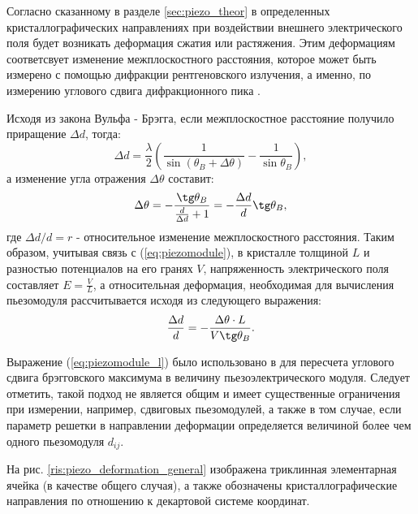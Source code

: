\label{sec:pieao_method}
Согласно сказанному в разделе \ref{sec:piezo_theor} в определенных кристаллографических
направлениях при воздействии внешнего электрического поля будет возникать деформация
сжатия или растяжения. Этим деформациям соответсвует изменение межплоскостного
 расстояния, которое может быть измерено с помощью дифракции рентгеновского
 излучения, а именно, по измерению углового сдвига дифракционного пика \cite{marchenkov2014}.

Исходя из закона Вульфа - Брэгга, если межплоскостное расстояние получило приращение
$\Delta d$, тогда:
$$ \Delta d = \frac{\lambda}{2}\left( \frac{1}{\sin(\theta_B + \Delta \theta) } - \frac{1}{\sin \theta_B } \right), $$
\noindent
а изменение угла отражения $\Delta \theta$ составит:
\begin{equation}
   \Delta \theta =-  \frac{\tg \theta_B}{\frac{d}{\Delta d}+1}  = -  \frac{\Delta d }{d}  \tg \theta_B,
\end{equation}
\noindent
где $\Delta d/d = r$ - относительное изменение межплоскостного расстояния.
Таким образом, учитывая связь с
(\ref{eq:piezomodule}),  в кристалле толщиной $L$ и разностью потенциалов на его
гранях $V$, напряженность электрического поля составляет $E = \frac{V}{L}$, а
относительная деформация, необходимая для вычисления пьезомодуля
 рассчитывается исходя из следующего выражения:
 \begin{equation}
    \frac{\Delta d}{d}  = -\frac{\Delta \theta \cdot L}{V \tg \theta_B}.
    \label{eq:piezomodule_l}
 \end{equation}

Выражение (\ref{eq:piezomodule_l}) было использовано в
\cite{kibalin2015, marchenkov2014,piezo101,piezo102} для
пересчета углового сдвига брэгговского максимума в величину пьезоэлектрического модуля.
Следует отметить, такой подход не является общим и имеет существенные ограничения при
измерении, например, сдвиговых пьезомодулей, а также в том случае, если параметр решетки
в направлении деформации определяется величиной более чем одного пьезомодуля $d_{ij}$.

На рис. \ref{ris:piezo_deformation_general} изображена триклинная элементарная ячейка
(в качестве общего случая),
а также обозначены кристаллографические направления по отношению к декартовой
системе координат.

